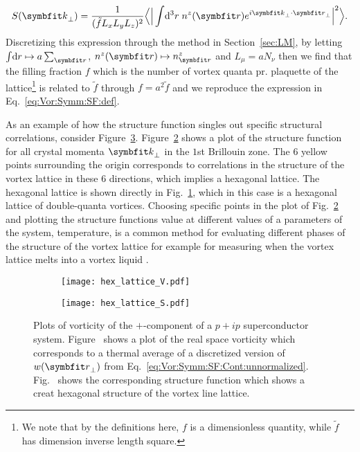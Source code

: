 \begin{equation}
    \label{eq:Vor:Symm:SF:Cont:structureFunction}
    S(\v{k}_\perp) = \frac{1}{(\tilde{f}L_xL_yL_z)^2}\Big\langle\Big|\int\!\mathrm{d}^3r\;n^z(\v{r})e^{i\v{k}_\perp\cdot\v{r}_\perp}\Big|^2\Big\rangle.
\end{equation}
Discretizing this expression through the method in Section~\ref{sec:LM}, \ie by letting $\int\!\mathrm{d}r\mapsto a\sum_\v{r}$, $n^z(\v{r})\mapsto n^z_\v{r}$ and $L_\mu = aN_\nu$ then
we find that the filling fraction $f$ which is the number of vortex quanta pr. plaquette of the lattice\footnote{We note that by the definitions here, $f$ is a dimensionless quantity, while $\tilde{f}$ has dimension inverse length square.} is related to $\tilde{f}$ through $f = a^2\tilde{f}$ and we reproduce the expression in
Eq.~\eqref{eq:Vor:Symm:SF:def}.

As an example of how the structure function singles out specific structural correlations, consider Figure~\ref{fig:Vor:Symm:SF:hex}. Figure~\ref{fig:Vor:Symm:SF:hex:S} shows a plot of the structure
function for all crystal momenta $\v{k}_\perp$ in the $1$st Brillouin zone. The $6$ yellow points surrounding the origin corresponds to correlations in the structure of the vortex lattice in these
$6$ directions, which implies a hexagonal lattice. The hexagonal lattice is shown directly in Fig.~\ref{fig:Vor:Symm:SF:hex:V}, which in this case is a hexagonal lattice of double-quanta vortices.
Choosing specific points in the plot of Fig.~\ref{fig:Vor:Symm:SF:hex:S} and plotting the structure functions value at different values of a parameters of the system, \eg temperature, is a common
method for evaluating different phases of the structure of the vortex lattice for example for measuring when the vortex lattice melts into a vortex liquid 
\cite{Smorgrav05,Smiseth05,NguyenPhase98,Nguyen96,NguyenOnsager98}.

\begin{figure}[h]
    \newcommand{\fractionwidth}{.45}
    \centering
    \begin{subfigure}[b]{\fractionwidth\textwidth}
        \centering
        \texttt{[image: hex\_lattice\_V.pdf]}
        \caption{\label{fig:Vor:Symm:SF:hex:V}}
    \end{subfigure}
    \hspace{2em}
    \begin{subfigure}[b]{\fractionwidth\textwidth}
        \centering
        \texttt{[image: hex\_lattice\_S.pdf]}
        \caption{\label{fig:Vor:Symm:SF:hex:S}}
    \end{subfigure}
    \caption{Plots of vorticity of the $+$-component of a $p+ip$ superconductor system. Figure~\protect{} shows a plot of the real space vorticity which corresponds to a thermal average of a discretized version of $w(\v{r}_\perp)$ from Eq.~\eqref{eq:Vor:Symm:SF:Cont:unnormalized}. Fig.~\protect{} shows the corresponding structure function which shows a creat hexagonal structure of the vortex line lattice.}
    \label{fig:Vor:Symm:SF:hex}
\end{figure}

